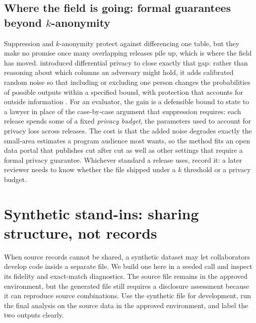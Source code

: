\documentclass[
    a4paper,
    fontsize=10pt,
    twoside=true,
    numbers=noenddot,
]{kaobook}
\begin{document}
\subsection{Where the field is going: formal guarantees beyond \texorpdfstring{$k$}{k}-anonymity}\label{sec:frontier-dp}
Suppression and $k$-anonymity protect against differencing one table, but they make no promise once many overlapping releases pile up, which is where the field has moved. \textcite{dwork2006diffpriv} introduced differential privacy to close exactly that gap: rather than reasoning about which columns an adversary might hold, it adds calibrated random noise so that including or excluding one person changes the probabilities of possible outputs within a specified bound, with protection that accounts for outside information \parencite{dworkroth2014found}.  For an evaluator, the gain is a defensible bound to state to a lawyer in place of the case-by-case argument that suppression requires: each release spends some of a fixed \emph{privacy budget}, the parameters used to account for privacy loss across releases. The cost is that the added noise degrades exactly the small-area estimates a program audience most wants, so the method fits an open data portal that publishes cut after cut as well as other settings that require a formal privacy guarantee. Whichever standard a release uses, record it: a later reviewer needs to know whether the file shipped under a $k$ threshold or a privacy budget.

\section{Synthetic stand-ins: sharing structure, not records}\label{sec:synth}
When source records cannot be shared, a synthetic dataset may let collaborators develop code inside a separate file. We build one here in a seeded call and inspect its fidelity and exact-match diagnostics. The source file remains in the approved environment, but the generated file still requires a disclosure assessment because it can reproduce source combinations. Use the synthetic file for development, run the final analysis on the source data in the approved environment, and label the two outputs clearly.
\end{document}
